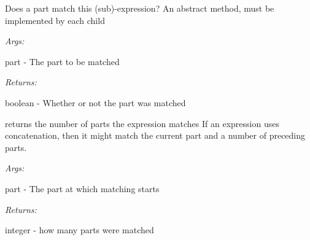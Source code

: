 \documentclass[letterpaper,10pt,english]{sphinxmanual}
\begin{document}
\begin{fulllineitems}

\begin{fulllineitems}
\label{modules/index:aosb.core.PointCutExpressionOperator.match}
Does a part match this (sub)-expression? An abstract method, must be implemented by each child

\begin{DUlineblock}{0em}
\item[] \emph{Args:}
\item[]
\begin{DUlineblock}{\DUlineblockindent}
\item[] part - The part to be matched
\end{DUlineblock}
\end{DUlineblock}

\begin{DUlineblock}{0em}
\item[] \emph{Returns:}
\item[]
\begin{DUlineblock}{\DUlineblockindent}
\item[] boolean - Whether or not the part was matched
\end{DUlineblock}
\end{DUlineblock}

\end{fulllineitems}


\begin{fulllineitems}
\label{modules/index:aosb.core.PointCutExpressionOperator.numberOfMatchingParts}
returns the number of parts the expression matches
\textbar{} If an expression uses concatenation, then it might match the current part and a number of preceding parts.

\begin{DUlineblock}{0em}
\item[] \emph{Args:}
\item[]
\begin{DUlineblock}{\DUlineblockindent}
\item[] part - The part at which matching starts
\end{DUlineblock}
\end{DUlineblock}

\begin{DUlineblock}{0em}
\item[] \emph{Returns:}
\item[]
\begin{DUlineblock}{\DUlineblockindent}
\item[] integer - how many parts were matched
\end{DUlineblock}
\end{DUlineblock}


\end{fulllineitems}
\end{fulllineitems}
\end{document}
